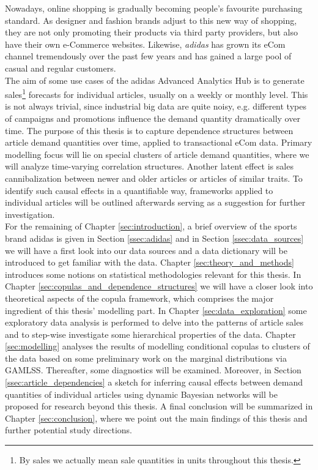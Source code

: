 

Nowadays, online shopping is gradually becoming people's favourite purchasing standard. As designer and fashion brands adjust to this new way of shopping, they are not only promoting their products via third party 	providers, but also have their own e-Commerce websites. Likewise, \textit{adidas} has grown its eCom channel tremendously over the past few years and has gained a large pool of casual and regular customers.
\\

The aim of some use cases of the adidas Advanced Analytics Hub is to generate sales\footnote{By sales we actually mean sale quantities in units throughout this thesis.} forecasts for individual articles, usually on a weekly or monthly level. This is not always trivial, since industrial big data are quite noisy, e.g. different types of campaigns and promotions influence the demand quantity dramatically over time. The purpose of this thesis is to capture dependence structures between article demand quantities over time, applied to transactional eCom data. Primary modelling focus will lie on special clusters of article demand quantities, where we will analyze time-varying correlation structures. Another latent effect is sales cannibalization between newer and older articles or articles of similar traits. To identify such causal effects in a quantifiable way, frameworks applied to individual articles will be outlined afterwards serving as a suggestion for further investigation.
\\

For the remaining of Chapter \ref{sec:introduction}, a brief overview of the sports brand adidas is given in Section \ref{ssec:adidas} and in Section \ref{ssec:data_sources} we will have a first look into our data sources and a data dictionary will be introduced to get familiar with the data. Chapter \ref{sec:theory_and_methods} introduces some notions on statistical methodologies relevant for this thesis. In Chapter \ref{sec:copulas_and_dependence_structures} we will have a closer look into theoretical aspects of the copula framework, which comprises the major ingredient of this thesis' modelling part. In Chapter \ref{sec:data_exploration} some exploratory data analysis is performed to delve into the patterns of article sales and to step-wise investigate some hierarchical properties of the data.  Chapter \ref{sec:modelling} analyses the results of modelling conditional copulas to clusters of the data based on some preliminary work on the marginal distributions via GAMLSS. Thereafter, some diagnostics will be examined. Moreover, in Section \ref{ssec:article_dependencies} a sketch for inferring causal effects between demand quantities of individual articles using dynamic Bayesian networks will be proposed for research beyond this thesis. A final conclusion will be summarized in Chapter \ref{sec:conclusion}, where we point out the main findings of this thesis and further potential study directions.




